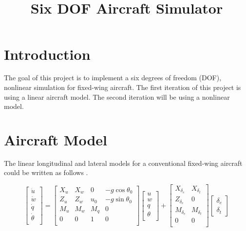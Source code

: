 \documentclass{article}
\title{\textbf{Six DOF Aircraft Simulator}}
\begin{document}
\maketitle

\section{Introduction}
The goal of this project is to implement a six degrees of freedom (DOF), nonlinear simulation for fixed-wing aircraft. 
The first iteration of this project is using a linear aircraft model. The second iteration will be using a nonlinear model. 
   
\section{Aircraft Model}
The linear longitudinal and lateral models for a conventional fixed-wing aircraft could be written as follows \cite{Nelson}.

\begin{equation} \label{Eq:Linear_Long_sys}
    \begin{bmatrix}
    \dot{u} \\
    \dot{w} \\
    \dot{q} \\
    \dot{\theta} \\ 	
    \end{bmatrix}
    =
    \begin{bmatrix}
    X_u & X_w & 0 & -g \cos{\theta_0}\\
    Z_u & Z_w & u_0 & -g \sin{\theta_0}\\
    M_u & M_w & M_q & 0\\
    0 & 0 & 1 & 0 \\
    \end{bmatrix}
    \begin{bmatrix}
    u \\
    w \\
    q \\
    \theta \\ 	
    \end{bmatrix}
    +
    \begin{bmatrix}
    X_{\delta_e} & X_{\delta_t} \\
    Z_{\delta_e} & 0 \\
    M_{\delta_e} & M_{\delta_t} \\
    0 & 0\\ 	
    \end{bmatrix}
    \begin{bmatrix}
    {\delta_e} \\
    {\delta_t}  	
    \end{bmatrix}
\end{equation}
\end{document}
